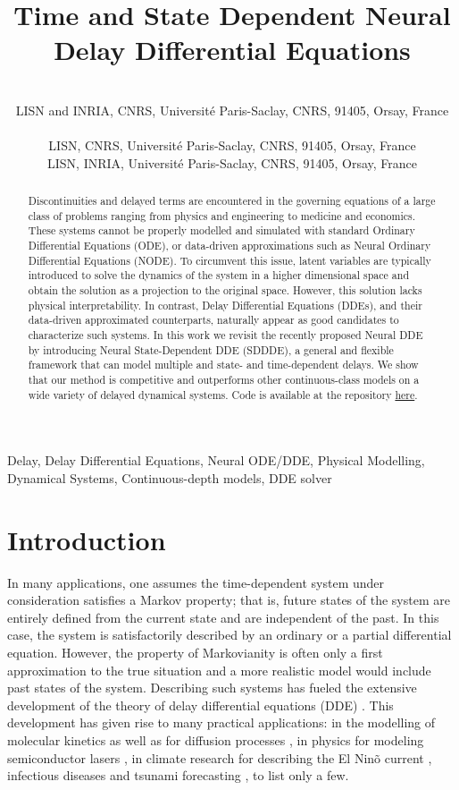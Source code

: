 \documentclass[pmlr]{jmlr}%
\title[Time and State Dependent Neural Delay Differential Equations]{Time and State Dependent Neural Delay Differential Equations}
\author{\Name{Thibault Monsel} \Email{thibault.monsel@inria.fr}\\
    \addr LISN and INRIA, CNRS, Université Paris-Saclay, CNRS, 91405, Orsay, France
    \AND
  \Name{Onofrio Semeraro} \Email{onofrio.semeraro@universite-paris-saclay.fr} \\
  \Name{Lionel Mathelin} \Email{lionel.mathelin@cnrs.fr}\\
    \addr LISN, CNRS, Université Paris-Saclay, CNRS, 91405, Orsay, France
    \AND
   \Name{Guillaume Charpiat} \Email{guillaume.charpiat@inria.fr}\\
 \addr LISN, INRIA, Université Paris-Saclay, CNRS, 91405, Orsay, France}
\begin{document}
\maketitle

\begin{abstract}
%
Discontinuities and delayed terms are encountered in the governing equations of a large class of problems ranging from physics and engineering to medicine and economics. These systems cannot be properly modelled and simulated with standard Ordinary Differential Equations (ODE), or data-driven approximations such as Neural Ordinary Differential Equations (NODE). To circumvent this issue, latent variables are typically introduced to solve the dynamics of the system in a higher dimensional space and obtain the solution as a projection to the original space. However, this solution lacks physical interpretability. In contrast, Delay Differential Equations (DDEs), and their data-driven approximated counterparts, naturally appear as good candidates to characterize such systems. In this work we revisit the recently proposed Neural DDE by introducing Neural State-Dependent DDE (SDDDE), a general and flexible framework that can model multiple and state- and time-dependent delays. We show that our method is competitive and outperforms other continuous-class models on a wide variety of delayed dynamical systems. Code is available at the repository \href{https://github.com/thibmonsel/Time-and-State-Dependent-Neural-Delay-Differential-Equations}{here}.

%
\end{abstract}
\begin{keywords}
Delay, Delay Differential Equations, Neural ODE/DDE, Physical Modelling, Dynamical Systems, Continuous-depth models, DDE solver  
\end{keywords}

\section{Introduction}
\label{sec:intro}

In many applications, one assumes the time-dependent system under consideration satisfies a Markov property; that is, future states of the system are entirely defined from the current state and are independent of the past. In this case, the system is satisfactorily described by an ordinary or a partial differential equation. However, the property of Markovianity is often only a first approximation to the true situation and a more realistic model would include past states of the system. Describing such systems has fueled the extensive development of the theory of delay differential equations (DDE) \citep{minorksy,Myshkis,Hale1963}. This development has given rise to many practical applications: in the modelling of molecular kinetics \citep{Roussel1996} as well as for diffusion processes \citep{Epstein1990DifferentialDE}, in physics for modeling semiconductor lasers \citep{laser}, in climate research for describing the El Nin\~o current \citep{nino,nino2}, infectious diseases \citep{cooper2020sir} and tsunami forecasting \citep{wu2022mining}, to list only a few.
\\
\end{document}

